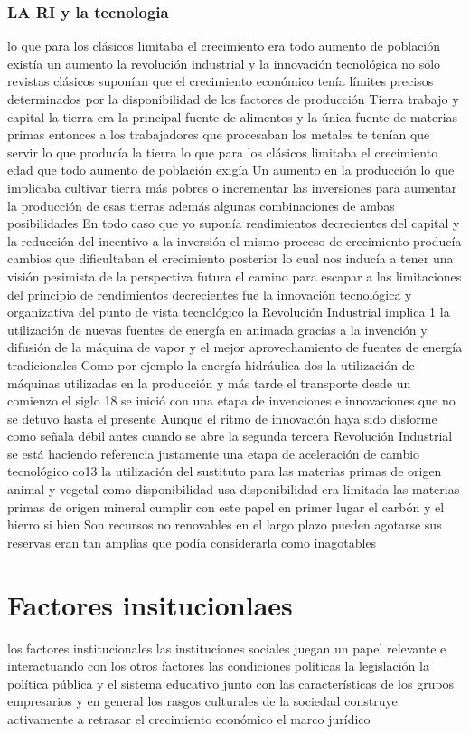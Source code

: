 \documentclass[12pt]{book}
\begin{document}
\subsubsection{LA RI y la tecnologia}
lo que para los clásicos limitaba el crecimiento era todo aumento de población existía un aumento la revolución industrial y la innovación tecnológica no sólo revistas clásicos suponían que el crecimiento económico tenía límites precisos determinados por la disponibilidad de los factores de producción Tierra trabajo y capital la tierra era la principal fuente de alimentos y la única fuente de materias primas entonces a los trabajadores que procesaban los metales te tenían que servir lo que producía la tierra lo que para los clásicos limitaba el crecimiento edad que todo aumento de población exigía Un aumento en la producción lo que implicaba cultivar tierra más pobres o incrementar las inversiones para aumentar la producción de esas tierras además algunas combinaciones de ambas posibilidades En todo caso que yo suponía rendimientos decrecientes del capital y la reducción del incentivo a la inversión el mismo proceso de crecimiento producía cambios que dificultaban el crecimiento posterior lo cual nos inducía a tener una visión pesimista de la perspectiva futura el camino para escapar a las limitaciones del principio de rendimientos decrecientes fue la innovación tecnológica y organizativa del punto de vista tecnológico la Revolución Industrial implica 1 la utilización de nuevas fuentes de energía en animada gracias a la invención y difusión de la máquina de vapor y el mejor aprovechamiento de fuentes de energía tradicionales Como por ejemplo la energía hidráulica dos la utilización de máquinas utilizadas en la producción y más tarde el transporte desde un comienzo el siglo 18 se inició con una etapa de invenciones e innovaciones que no se detuvo hasta el presente Aunque el ritmo de innovación haya sido disforme como señala débil antes cuando se abre la segunda tercera Revolución Industrial se está haciendo referencia justamente una etapa de aceleración de cambio tecnológico co13 la utilización del sustituto para las materias primas de origen animal y vegetal como disponibilidad usa disponibilidad era limitada las materias primas de origen mineral cumplir con este papel en primer lugar el carbón y el hierro si bien Son recursos no renovables en el largo plazo pueden agotarse sus reservas eran tan amplias que podía considerarla como inagotables
\section{Factores insitucionlaes}
los factores institucionales las instituciones sociales juegan un papel relevante e interactuando con los otros factores las condiciones políticas la legislación la política pública y el sistema educativo junto con las características de los grupos empresarios y en general los rasgos culturales de la sociedad construye activamente a retrasar el crecimiento económico el marco jurídico
\end{document}
